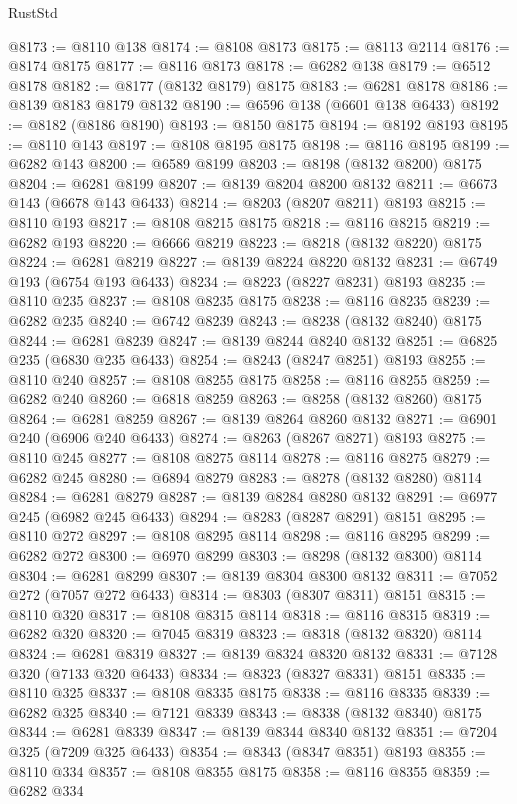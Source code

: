 \begin{lexlean}{RustStd}
\begin{coremodule}
@8173 := @8110 @138
@8174 := @8108 @8173
@8175 := @8113 @2114
@8176 := @8174 @8175
@8177 := @8116 @8173
@8178 := @6282 @138
@8179 := @6512 @8178
@8182 := @8177 (@8132 @8179) @8175
@8183 := @6281 @8178
@8186 := @8139 @8183 @8179 @8132
@8190 := @6596 @138 (@6601 @138 @6433)
@8192 := @8182 (@8186 @8190)
@8193 := @8150 @8175
@8194 := @8192 @8193
@8195 := @8110 @143
@8197 := @8108 @8195 @8175
@8198 := @8116 @8195
@8199 := @6282 @143
@8200 := @6589 @8199
@8203 := @8198 (@8132 @8200) @8175
@8204 := @6281 @8199
@8207 := @8139 @8204 @8200 @8132
@8211 := @6673 @143 (@6678 @143 @6433)
@8214 := @8203 (@8207 @8211) @8193
@8215 := @8110 @193
@8217 := @8108 @8215 @8175
@8218 := @8116 @8215
@8219 := @6282 @193
@8220 := @6666 @8219
@8223 := @8218 (@8132 @8220) @8175
@8224 := @6281 @8219
@8227 := @8139 @8224 @8220 @8132
@8231 := @6749 @193 (@6754 @193 @6433)
@8234 := @8223 (@8227 @8231) @8193
@8235 := @8110 @235
@8237 := @8108 @8235 @8175
@8238 := @8116 @8235
@8239 := @6282 @235
@8240 := @6742 @8239
@8243 := @8238 (@8132 @8240) @8175
@8244 := @6281 @8239
@8247 := @8139 @8244 @8240 @8132
@8251 := @6825 @235 (@6830 @235 @6433)
@8254 := @8243 (@8247 @8251) @8193
@8255 := @8110 @240
@8257 := @8108 @8255 @8175
@8258 := @8116 @8255
@8259 := @6282 @240
@8260 := @6818 @8259
@8263 := @8258 (@8132 @8260) @8175
@8264 := @6281 @8259
@8267 := @8139 @8264 @8260 @8132
@8271 := @6901 @240 (@6906 @240 @6433)
@8274 := @8263 (@8267 @8271) @8193
@8275 := @8110 @245
@8277 := @8108 @8275 @8114
@8278 := @8116 @8275
@8279 := @6282 @245
@8280 := @6894 @8279
@8283 := @8278 (@8132 @8280) @8114
@8284 := @6281 @8279
@8287 := @8139 @8284 @8280 @8132
@8291 := @6977 @245 (@6982 @245 @6433)
@8294 := @8283 (@8287 @8291) @8151
@8295 := @8110 @272
@8297 := @8108 @8295 @8114
@8298 := @8116 @8295
@8299 := @6282 @272
@8300 := @6970 @8299
@8303 := @8298 (@8132 @8300) @8114
@8304 := @6281 @8299
@8307 := @8139 @8304 @8300 @8132
@8311 := @7052 @272 (@7057 @272 @6433)
@8314 := @8303 (@8307 @8311) @8151
@8315 := @8110 @320
@8317 := @8108 @8315 @8114
@8318 := @8116 @8315
@8319 := @6282 @320
@8320 := @7045 @8319
@8323 := @8318 (@8132 @8320) @8114
@8324 := @6281 @8319
@8327 := @8139 @8324 @8320 @8132
@8331 := @7128 @320 (@7133 @320 @6433)
@8334 := @8323 (@8327 @8331) @8151
@8335 := @8110 @325
@8337 := @8108 @8335 @8175
@8338 := @8116 @8335
@8339 := @6282 @325
@8340 := @7121 @8339
@8343 := @8338 (@8132 @8340) @8175
@8344 := @6281 @8339
@8347 := @8139 @8344 @8340 @8132
@8351 := @7204 @325 (@7209 @325 @6433)
@8354 := @8343 (@8347 @8351) @8193
@8355 := @8110 @334
@8357 := @8108 @8355 @8175
@8358 := @8116 @8355
@8359 := @6282 @334

\end{coremodule}
\end{lexlean}
